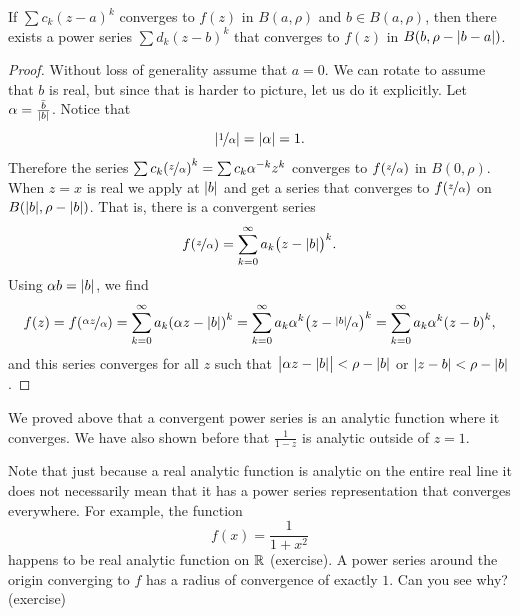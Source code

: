 \begin{cor}
If $\sum c_k {(z-a)}^k$ converges to $f(z)$ in $B(a,\rho)$ and $b \in
B(a,\rho)$,
then there exists a power series
$\sum d_k {(z-b)}^k$ that converges to $f(z)$ in $B(b,\rho-\lvert {b-a} \rvert)$.
\end{cor}

\begin{proof}
Without loss of generality assume that $a=0$.  We can rotate to assume that $b$ is real, but
since that is harder to picture, let us do it explicitly.
Let $\alpha = \frac{\bar{b}}{\lvert {b} \rvert}$.
Notice that
\begin{equation*}
\abs{\nicefrac{1}{\alpha}} = \sabs{\alpha} %
= 1 .
\end{equation*}
Therefore the series
$\sum c_k {(\nicefrac{z}{\alpha})}^k = 
\sum c_k \alpha^{-k} {z}^k$
converges to $f(\nicefrac{z}{\alpha})$ in $B(0,\rho)$.
When $z=x$ is real
we apply  at $\lvert {b} \rvert$ and get
a series that converges
to $f(\nicefrac{z}{\alpha})$ on $B(\lvert {b} \rvert,\rho-\lvert {b} \rvert)$.
That is, there is a convergent series
\begin{equation*}
f(\nicefrac{z}{\alpha}) =
\sum_{k=0}^\infty a_k {\bigl(z - \lvert {b} \rvert\bigr)}^k .
\end{equation*}
Using $\alpha b = \lvert {b} \rvert$, we find
\begin{equation*}
f(z) = f(\nicefrac{\alpha z}{\alpha}) =
\sum_{k=0}^\infty a_k {(\alpha z - \lvert {b} \rvert)}^k 
=
\sum_{k=0}^\infty a_k\alpha^k {\bigl(z - \nicefrac{\lvert {b} \rvert}{\alpha}\bigr)}^k
=
\sum_{k=0}^\infty a_k\alpha^k {(z - b)}^k ,
\end{equation*}
and this series converges for all $z$ such that
$\bigl\lvert \alpha z-\lvert {b} \rvert\bigr\rvert < \rho-\lvert {b} \rvert$
or $\lvert {z - b} \rvert < \rho-\lvert {b} \rvert$.
\end{proof}

We proved above that a convergent power series is an
analytic function where it converges.  We have also shown before that
$\frac{1}{1-z}$ is analytic outside of $z=1$.

Note that just because a real analytic function is analytic on the
entire real line it does not necessarily mean that it has a power series
representation that converges everywhere.  For example, the function
\begin{equation*}
f(x) = \frac{1}{1+x^2}
\end{equation*}
happens to be real analytic function on ${\mathbb{R}}$ (exercise).  A power
series around the origin converging to $f$
has a radius of convergence of exactly $1$.
Can you see why? (exercise)

